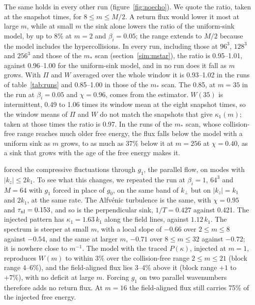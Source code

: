 The same holds in every other run (figure~\ref{fig:noecho}). We quote the ratio, taken at the snapshot times, for $8\le m\le M/2$. A return flux would lower it most at large $m$, while at small $m$ the sink alone lowers the ratio of the uniform-sink model, by up to 8\% at $m=2$ and $\beta_i=0.05$; the range extends to $M/2$ because the model includes the hypercollisions. In every run, including those at $96^3$, $128^3$ and $256^3$ and those of the $m_*$ scan (section~\ref{sim:mstar}), the ratio is 0.95--1.01, against 0.96--1.00 for the uniform-sink model, and in no run does it fall as $m$ grows. With $\Pi$ and $W$ averaged over the whole window it is 0.93--1.02 in the runs of table~\ref{tab:runs} and 0.85--1.00 in those of the $m_*$ scan. The 0.85, at $m=35$ in the run at $\beta_i=0.05$ and $\chi=0.96$, comes from the estimator. $W(35)$ is intermittent, 0.49 to 1.06 times its window mean at the eight snapshot times, so the window means of $\Pi$ and $W$ do not match the snapshots that give $\kappa_1(m)$; taken at those times the ratio is 0.97. In the runs of the $m_*$ scan, whose collision-free range reaches much older free energy, the flux falls below the model with a uniform sink as $m$ grows, to as much as 37\% below it at $m=256$ at $\chi=0.40$, as a sink that grows with the age of the free energy makes it.

\label{sim:mf1}\citet{Meyrand2019} forced the compressive fluctuations through $g_1$, the parallel flow, on modes with $|k_z|\le2k_1$. To see what this changes, we repeated the run at $\beta_i=1$, $64^3$ and $M=64$ with $g_1$ forced in place of $g_0$, on the same band of $k_\perp$ but on $|k_z|=k_1$ and $2k_1$, at the same rate. The Alfv\'enic turbulence is the same, with $\chi=0.95$ and $\tau_{\rm nl}=0.153$, and so is the perpendicular sink, $1/T=0.427$ against 0.421. The injected pattern has $\kappa_1=1.63\,k_1$ along the field lines, against $1.12\,k_1$. The spectrum is steeper at small $m$, with a local slope of $-0.66$ over $2\le m\le8$ against $-0.54$, and the same at larger $m$, $-0.71$ over $8\le m\le32$ against $-0.72$; it is nowhere close to $m^{-1}$. The model with the traced $P(\kappa)$, injected at $m=1$, reproduces $W(m)$ to within 3\% over the collision-free range $2\le m\le21$ (block range 4--6\%), and the field-aligned flux lies 3--4\% above it (block range $+1$ to $+7\%$), with no deficit at large $m$. Forcing $g_1$ on two parallel wavenumbers therefore adds no return flux. At $m=16$ the field-aligned flux still carries 75\% of the injected free energy.

